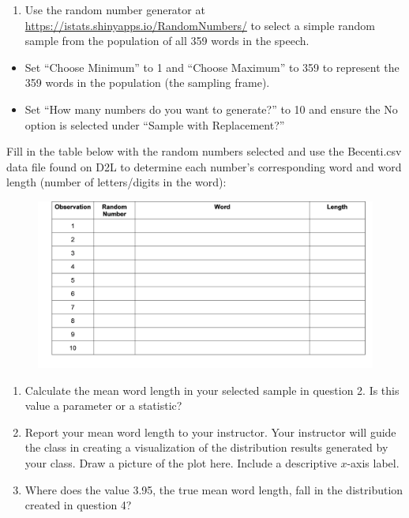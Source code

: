 \documentclass[
]{report}
\providecommand{\tightlist}{%
  \setlength{\itemsep}{0pt}\setlength{\parskip}{0pt}}
\begin{document}
\begin{enumerate}
\def\labelenumi{\arabic{enumi}.}
\setcounter{enumi}{1}
\tightlist
\item
  Use the random number generator at \url{https://istats.shinyapps.io/RandomNumbers/} to select a simple random sample from the population of all 359 words in the speech.
\end{enumerate}

\begin{itemize}
\item
  Set ``Choose Minimum'' to 1 and ``Choose Maximum'' to 359 to represent the 359 words in the population (the sampling frame).
\item
  Set ``How many numbers do you want to generate?'' to 10 and ensure the No option is selected under ``Sample with Replacement?''
\end{itemize}

Fill in the table below with the random numbers selected and use the Becenti.csv data file found on D2L to determine each number's corresponding word and word length (number of letters/digits in the word):

\begin{figure}

{\centering \includegraphics[width=0.65\linewidth]{images/random_word_length} 

}

\end{figure}

\begin{enumerate}
\def\labelenumi{\arabic{enumi}.}
\setcounter{enumi}{2}
\item
  Calculate the mean word length in your selected sample in question 2. Is this value a parameter or a statistic?
  \vspace{0.3in}
\item
  Report your mean word length to your instructor. Your instructor will guide the class in creating a visualization of the distribution results generated by your class. Draw a picture of the plot here. Include a descriptive \(x\)-axis label.
  \vspace{1.7in}
\item
  Where does the value 3.95, the true mean word length, fall in the distribution created in question 4?
  \vspace{0.3in}
\end{enumerate}
\end{document}
